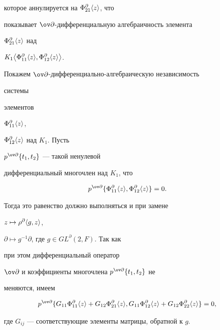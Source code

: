 \begin{pf}
которое аннулируется на $\Phi^\partial_{21}\langle z \rangle$, что  


показывает $\ov\partial$-дифференциальную алгебраичность элемента 


$\Phi^\partial_{21}\langle z \rangle$ над  


$K_1\big\la\Phi^\partial_{11}\la z \ra, 


\Phi^\partial_{12}\la z \ra\big\ra$. 


 


Покажем $\ov\partial$-дифференциально-алгебраическую независимость 


системы 


элементов 


$\Phi^\partial_{11}\langle z \rangle$, 


$\Phi^\partial_{12}\langle z \rangle$ над $K_1$. Пусть 


$p^{\ov\partial}\{t_1,t_2\}$ --- такой ненулевой  


дифференциальный многочлен над $K_1$, что 


$$ 


p^{\ov\partial}\{ 


\Phi^\partial_{11}\la z \ra, 


\Phi^\partial_{12}\la z \ra\}=0. 


$$ 


Тогда это равенство должно выполняться и при замене 


$z\mapsto\rho^\partial\langle g,z \rangle$, 


$\partial\mapsto g^{-1}\partial$, где $g\in GL^\partial(2,F)$. Так как 


при этом дифференциальный оператор 


$\ov\partial$ и коэффициенты многочлена $p^{\ov\partial}\{t_1,t_2\}$ не 


меняются, имеем 


\begin{equation} 


p^{\ov\partial}\{G_{11} 


\Phi^\partial_{11}\la z \ra+G_{12} 


\Phi^\partial_{21}\la z \ra,G_{11} 


\Phi^\partial_{12}\la z \ra+G_{12} 


\Phi^\partial_{22}\la z \ra\}=0, 


\end{equation} 


где $G_{ij}$ --- соответствующие элементы матрицы, обратной к $g$. 



\end{pf}
